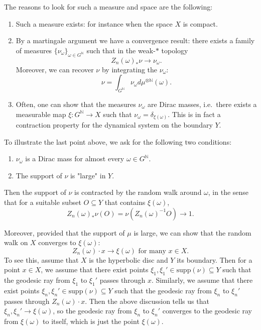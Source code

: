 \documentclass{report}
\begin{document}
The reasons to look for such a measure and space are the following:
\begin{enumerate}
    \item Such a measure exists: for instance when the space $X$ is compact.
    \item By a martingale argument we have a convergence result: there exists a family of measures $\{\nu_\omega\}_{\omega \in G^\mathbb N}$ such that in the weak-$*$ topology
    \[
    Z_n(\omega)_* \nu \to \nu_\omega.
    \]
    Moreover, we can recover $\nu$ by integrating the $\nu_\omega$:
    \[
    \nu = \int_{G^\mathbb N} \nu_\omega d\mu^{\otimes \mathbb N}(\omega).
    \]
    \item Often, one can show that the measures $\nu_\omega$ are Dirac masses, i.e.\ there exists a measurable map $\xi: G^\mathbb N \to X$ such that $\nu_\omega = \delta_{\xi(\omega)}$.
    This is in fact a contraction property for the dynamical system on the boundary $Y$.
\end{enumerate}
To illustrate the last point above, we ask for the following two conditions:
\begin{enumerate}
    \item $\nu_\omega$ is a Dirac mass for almost every $\omega \in G^\mathbb N$.
    \item The support of $\nu$ is "large" in $Y$.
\end{enumerate} 
Then the support of $\nu$ is contracted by the random walk around $\omega$, in the sense that for a suitable subset $O \subseteq Y$ that contains $\xi(\omega)$,
\[
Z_n(\omega)_* \nu(O) = \nu(Z_n(\omega)^{-1} O) \to 1.
\]

Moreover, provided that the support of $\mu$ is large, we can show that the random walk on $X$ converges to $\xi(\omega)$:
\[
Z_n(\omega) \cdot x \to \xi(\omega) \text{ for many } x \in X.
\]
To see this, assume that $X$ is the hyperbolic disc and $Y$ its boundary.
Then for a point $x \in X$, we assume that there exist points $\xi_1, \xi_1' \in \mathrm{supp}(\nu) \subseteq Y$ such that the geodesic ray from $\xi_1$ to $\xi_1'$ passes through $x$.
Similarly, we assume that there exist points $\xi_n, \xi_n' \in \mathrm{supp}(\nu) \subseteq Y$ such that the geodesic ray from $\xi_n$ to $\xi_n'$ passes through $Z_n(\omega) \cdot x$.
Then the above discussion tells us that $\xi_n, \xi_n' \to \xi(\omega)$, so the geodesic ray from $\xi_n$ to $\xi_n'$ converges to the geodesic ray from $\xi(\omega)$ to itself, which is just the point $\xi(\omega)$.
\end{document}
